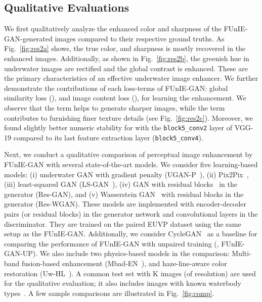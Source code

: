 \documentclass[10pt,twocolumn,letterpaper]{article}
\begin{document}
\subsection{Qualitative Evaluations}
We first qualitatively analyze the enhanced color and sharpness of the FUnIE-GAN-generated images compared to their respective ground truths. As Fig.~\ref{fig:res2a} shows, the true color, and sharpness is mostly recovered in the enhanced images. Additionally, as shown in Fig.~\ref{fig:res2b}, the greenish hue in underwater images are rectified and the global contrast is enhanced. These are the primary characteristics of an effective underwater image enhancer. 
We further demonstrate the contributions of each loss-terms of FUnIE-GAN: global similarity loss (), and image content loss (), for learning the enhancement. We observe that the  term helps to generate sharper images, while the  term contributes to furnishing finer texture details (see Fig.~\ref{fig:res2c}). Moreover, we found slightly better numeric stability for  with the {\tt block5\_conv2} layer of VGG-19 compared to its last feature extraction layer ({\tt block5\_conv4}). 




Next, we conduct a qualitative comparison of perceptual image enhancement by FUnIE-GAN with several state-of-the-art models. We consider five learning-based models: (i) underwater GAN with gradient penalty (UGAN-P~\cite{fabbri2018enhancing}), (ii) Pix2Pix~\cite{isola2017image}, (iii) least-squared GAN (LS-GAN~\cite{mao2017least}), (iv) GAN with residual blocks~\cite{li2017perceptual} in the generator (Res-GAN), and (v) Wasserstein GAN~\cite{arjovsky2017wasserstein} with residual blocks in the generator (Res-WGAN). These models are implemented with  encoder-decoder pairs (or  residual blocks) in the generator network and  convolutional layers in the discriminator. They are trained on the paired EUVP dataset using the same setup as the FUnIE-GAN. Additionally, we consider CycleGAN~\cite{zhu2017unpaired} as a baseline for comparing the performance of FUnIE-GAN with unpaired training (\ie, FUnIE-GAN-UP). We also include two physics-based models in the comparison: Multi-band fusion-based enhancement (Mbad-EN~\cite{cho2018model}), and haze-line-aware color restoration (Uw-HL~\cite{berman2018underwater}).   
A common test set with K images (of  resolution) are used for the qualitative evaluation; it also includes  images with known waterbody types~\cite{berman2018underwater}. A few sample comparisons are illustrated in Fig.~\ref{fig:comp}.    
\end{document}
